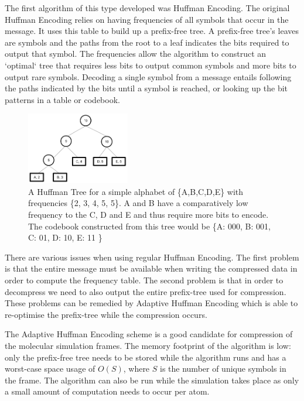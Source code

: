 \documentclass[a4paper,11pt]{report}
\begin{document}
The first algorithm of this type developed was Huffman Encoding\cite{citeulike:1320251}. The original Huffman Encoding relies on having frequencies of all symbols that occur in the message. It uses this table to build up a prefix-free tree. A prefix-free tree's leaves are symbols and the paths from the root to a leaf indicates the bits required to output that symbol. The frequencies allow the algorithm to construct an `optimal` tree that requires less bits to output common symbols and more bits to output rare symbols. Decoding a single symbol from a message  entails following the paths indicated by the bits until a symbol is reached, or looking up the bit patterns in a table or codebook.

\begin{figure}
 \center
 \includegraphics[width=0.4\textwidth]{resources/HuffmanTreeCropped.png}
\caption{A Huffman Tree for a simple alphabet of \{A,B,C,D,E\} with frequencies \{2, 3, 4, 5, 5\}. A and B have a comparatively low frequency to the C, D and E and thus require more bits to encode. The codebook constructed from this tree would be \{A: 000, B: 001, C: 01, D: 10, E: 11 \}}
\label{huffman}
\end{figure}

There are various issues when using regular Huffman Encoding. The first problem is that the entire message must be available when writing the compressed data in order to compute the frequency table.\cite{RefWorks:1} The second problem is that in order to decompress we need to also output the entire prefix-tree used for compression. These problems can be remedied by Adaptive Huffman Encoding\cite{42227} which is able to re-optimise the prefix-tree while the compression occurs.

The Adaptive Huffman Encoding scheme is a good candidate for compression of the molecular simulation frames. The memory footprint of the algorithm is low: only the prefix-free tree needs to be stored while the algorithm runs and has a worst-case space usage of $O(S)$, where $S$ is the number of unique symbols in the frame. The algorithm can also be run while the simulation takes place as only a small amount of computation needs to occur per atom.
\end{document}
